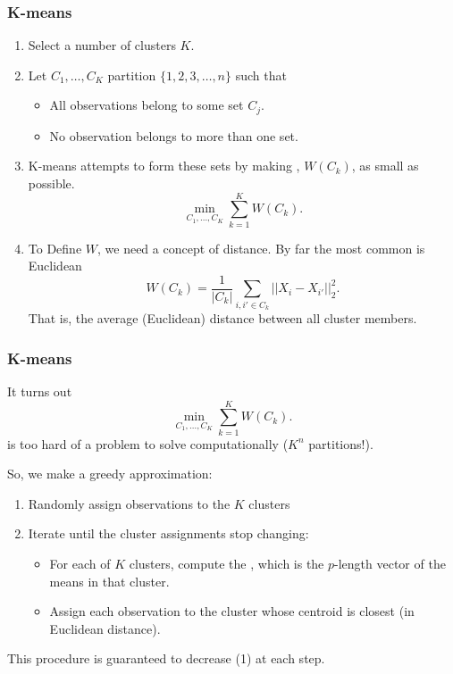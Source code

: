 \documentclass{beamer}
\begin{document}
\title{}
\subtitle{\classTitle}
\date{}



\begin{frame}
\maketitle
%
\organization
%
\end{frame}

\begin{frame}[fragile]
\frametitle{K-means}
\begin{enumerate}
\item Select a number of clusters $K$.
\item Let $C_1,\ldots,C_K$ partition $\{1,2,3,\ldots,n\}$ such that
	\begin{itemize}
		\item All observations belong to some set $C_j$.
		\item No observation belongs to more than one set.
	\end{itemize}
\item K-means attempts to form these sets by making , $W(C_k)$, as small as possible.
\[
\min_{C_1,\ldots,C_K} \sum_{k=1}^K W(C_k).
\]
\item To Define $W$, we need a concept of distance.  By far the most common is Euclidean
\[
W(C_k) =  \frac{1}{|C_k|} \sum_{i,i' \in C_k} ||X_i - X_{i'}||_2^2.
\]
That is, the average (Euclidean) distance between all cluster members.
\end{enumerate}
\end{frame}

\begin{frame}[fragile]
\frametitle{K-means}
It turns out
\begin{equation}
\min_{C_1,\ldots,C_K} \sum_{k=1}^K W(C_k).
\end{equation}
is too hard of a problem to solve computationally ($K^n$ partitions!).

\vsp
So, we make a greedy approximation:
\begin{enumerate}
\item Randomly assign observations to the $K$ clusters
\item Iterate until the cluster assignments stop changing:
\begin{itemize}
\item For each of $K$ clusters, compute the , which is the $p$-length vector of the means in that
cluster.
\item Assign each observation to the cluster whose centroid is closest (in Euclidean distance).
\end{itemize}
\end{enumerate}
This procedure is guaranteed to decrease (1) at each step. 
\vsp

\end{frame}
\end{document}
